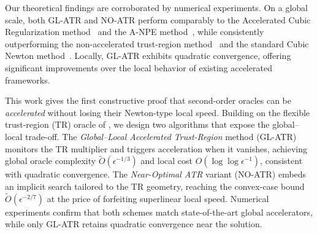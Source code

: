 
Our theoretical findings are corroborated by numerical experiments. On a global scale, both GL-ATR and NO-ATR perform comparably to the Accelerated Cubic Regularization method~\cite{nesterov2008accelerating} and the A-NPE method~\cite{monteiro2013accelerated}, while consistently outperforming the non-accelerated trust-region method~\cite{jiang2024nonconvexityuniversaltrustregionmethod} and the standard Cubic Newton method~\cite{nesterov2006cubic}. Locally, GL-ATR exhibits quadratic convergence, offering significant improvements over the local behavior of existing accelerated frameworks.

This work gives the first constructive proof that second-order oracles can be \emph{accelerated} without losing their Newton-type local speed. Building on the flexible trust-region (TR) oracle of \cite{jiang2024nonconvexityuniversaltrustregionmethod}, we design two algorithms that expose the global–local trade-off. The \emph{Global–Local Accelerated Trust-Region} method (GL-ATR) monitors the TR multiplier and triggers acceleration when it vanishes, achieving global oracle complexity $\tilde O(\epsilon^{-1/3})$ and local cost $O(\log\log\epsilon^{-1})$, consistent with quadratic convergence. The \emph{Near-Optimal ATR} variant (NO-ATR) embeds an implicit search tailored to the TR geometry, reaching the convex-case bound $\tilde O(\epsilon^{-2/7})$ at the price of forfeiting superlinear local speed. Numerical experiments confirm that both schemes match state-of-the-art global accelerators, while only GL-ATR retains quadratic convergence near the solution.

